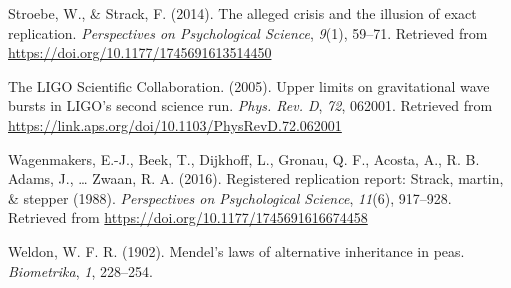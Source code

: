 \documentclass[english,floatsintext,man]{apa6}
\theoremstyle{definition}
\theoremstyle{definition}
\theoremstyle{definition}
\theoremstyle{remark}
\begin{document}
\leavevmode\hypertarget{ref-Stroebe:Strack:2014}{}%
Stroebe, W., \& Strack, F. (2014). The alleged crisis and the illusion
of exact replication. \emph{Perspectives on Psychological Science},
\emph{9}(1), 59--71. Retrieved from
\url{https://doi.org/10.1177/1745691613514450}

\leavevmode\hypertarget{ref-LIGO:2005}{}%
The LIGO Scientific Collaboration. (2005). Upper limits on gravitational
wave bursts in LIGO's second science run. \emph{Phys. Rev. D},
\emph{72}, 062001. Retrieved from
\url{https://link.aps.org/doi/10.1103/PhysRevD.72.062001}

\leavevmode\hypertarget{ref-Wagenmakers:etal:2016b}{}%
Wagenmakers, E.-J., Beek, T., Dijkhoff, L., Gronau, Q. F., Acosta, A.,
R. B. Adams, J., \ldots{} Zwaan, R. A. (2016). Registered replication
report: Strack, martin, \& stepper (1988). \emph{Perspectives on
Psychological Science}, \emph{11}(6), 917--928. Retrieved from
\url{https://doi.org/10.1177/1745691616674458}

\leavevmode\hypertarget{ref-Weldon:1902}{}%
Weldon, W. F. R. (1902). Mendel's laws of alternative inheritance in
peas. \emph{Biometrika}, \emph{1}, 228--254.
\end{document}
